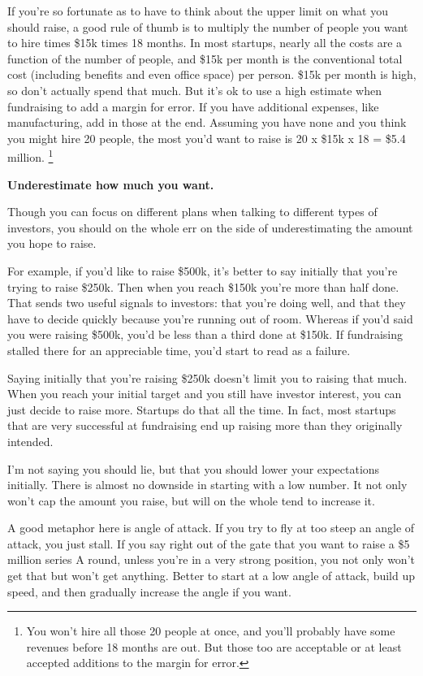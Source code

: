 \documentclass[12pt]{book}
\begin{document}
If you're so fortunate as to have to think about the upper limit on what
you should raise, a good rule of thumb is to multiply the number of
people you want to hire times \$15k times 18 months. In most startups,
nearly all the costs are a function of the number of people, and \$15k
per month is the conventional total cost (including benefits and even
office space) per person. \$15k per month is high, so don't actually
spend that much. But it's ok to use a high estimate when fundraising to
add a margin for error. If you have additional expenses, like
manufacturing, add in those at the end. Assuming you have none and you
think you might hire 20 people, the most you'd want to raise is 20 x
\$15k x 18 = \$5.4 million. \footnote{You won't hire all those 20 people at once, and you'll probably
have some revenues before 18 months are out. But those too are
acceptable or at least accepted additions to the margin for error.}

\textbf{Underestimate how much you want.}

Though you can focus on different plans when talking to different types
of investors, you should on the whole err on the side of underestimating
the amount you hope to raise.

For example, if you'd like to raise \$500k, it's better to say initially
that you're trying to raise \$250k. Then when you reach \$150k you're
more than half done. That sends two useful signals to investors: that
you're doing well, and that they have to decide quickly because you're
running out of room. Whereas if you'd said you were raising \$500k,
you'd be less than a third done at \$150k. If fundraising stalled there
for an appreciable time, you'd start to read as a failure.

Saying initially that you're raising \$250k doesn't limit you to raising
that much. When you reach your initial target and you still have
investor interest, you can just decide to raise more. Startups do that
all the time. In fact, most startups that are very successful at
fundraising end up raising more than they originally intended.

I'm not saying you should lie, but that you should lower your
expectations initially. There is almost no downside in starting with a
low number. It not only won't cap the amount you raise, but will on the
whole tend to increase it.

A good metaphor here is angle of attack. If you try to fly at too steep
an angle of attack, you just stall. If you say right out of the gate
that you want to raise a \$5 million series A round, unless you're in a
very strong position, you not only won't get that but won't get
anything. Better to start at a low angle of attack, build up speed, and
then gradually increase the angle if you want.
\end{document}
